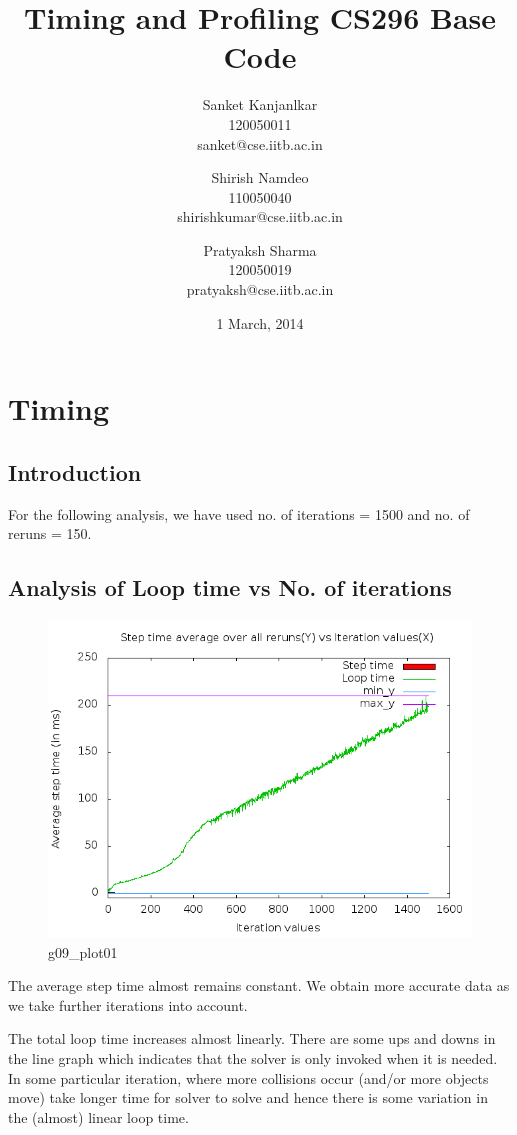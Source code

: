 \documentclass[11pt,english]{article}
\author{
                Sanket Kanjanlkar\\
                120050011\\
                sanket@cse.iitb.ac.in
                \and 
                Shirish Namdeo\\
                110050040\\
                shirishkumar@cse.iitb.ac.in
                \and
                Pratyaksh Sharma\\
                120050019\\
                pratyaksh@cse.iitb.ac.in
}
\title{Timing and Profiling CS296 Base Code}
\date{1 March, 2014}
\begin{document}
\maketitle
\section{Timing}
\subsection{Introduction}
\indent \par{For the following analysis, we have used no. of iterations = 1500 and no. of reruns = 150.}
\subsection{Analysis of Loop time vs No. of iterations}
\begin{figure}[h!]
\centering
\includegraphics[scale=.45]{g09_plot01.png}
\caption{g09\_plot01}
\end{figure}
\indent \par{
The average step time almost remains constant. We obtain more accurate data as we take further iterations into account.} 
\indent \par{The total loop time increases almost linearly. There are some ups and downs in the line graph which indicates that the solver is only invoked when it is needed. In some particular iteration, where more collisions occur (and/or more objects move) take longer time for solver to solve and hence there is some variation in the (almost) linear loop time.}
\end{document}
